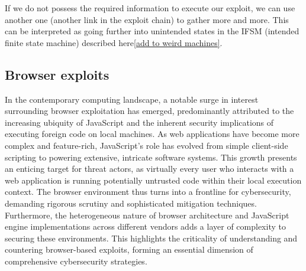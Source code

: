 \documentclass{article}
\begin{document}
\begin{minipage}{\textwidth}
  \centering
\end{minipage}

If we do not possess the required information to execute our exploit, we can use
another one (another link in the exploit chain) to gather more and more. This
can be interpreted as going further into unintended states in the IFSM (intended
finite state machine) described here\ref{add to weird machines}.

\subsection{Browser exploits}
In the contemporary computing landscape, a notable surge in interest surrounding
browser exploitation has emerged, predominantly attributed to the increasing
ubiquity of JavaScript and the inherent security implications of executing
foreign code on local machines. As web applications have become more complex and
feature-rich, JavaScript's role has evolved from simple client-side scripting to
powering extensive, intricate software systems. This growth presents an enticing
target for threat actors, as virtually every user who interacts with a web
application is running potentially untrusted code within their local execution
context. The browser environment thus turns into a frontline for cybersecurity,
demanding rigorous scrutiny and sophisticated mitigation techniques.
Furthermore, the heterogeneous nature of browser architecture and JavaScript
engine implementations across different vendors adds a layer of complexity to
securing these environments. This highlights the criticality of understanding
and countering browser-based exploits, forming an essential dimension of
comprehensive cybersecurity strategies.
\end{document}
